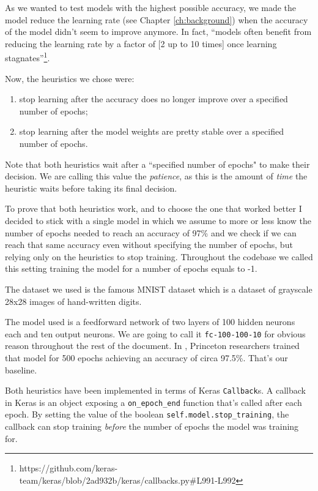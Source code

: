 As we wanted to test models with the highest possible accuracy, we made
the model reduce the learning rate (see Chapter \ref{ch:background})
when the accuracy of the model didn't seem to improve anymore. In fact,
``models often benefit from reducing the learning rate by a factor of
[2 up to 10 times] once learning
stagnates''\footnote{https://github.com/keras-team/keras/blob/2ad932b/keras/callbacks.py\#L991-L992}.

Now, the heuristics we chose were:
\begin{enumerate}
  \item stop learning after the accuracy does no longer improve over a
    specified number of epochs;
  \item stop learning after the model weights are pretty stable over a
    specified number of epochs.
\end{enumerate}

Note that both heuristics wait after a ``specified number of
epochs" to make their decision. We are calling this value the
\emph{patience}, as this is the amount of \emph{time} the heuristic waits
before taking its final decision.

To prove that both heuristics work, and to choose the one that
worked better I decided to stick with a single model in which we assume
to more or less know the number of epochs needed to reach an accuracy
of 97\% and we check if we can reach that same accuracy even without
specifying the number of epochs, but relying only on the heuristics to
stop training. Throughout the codebase we called this setting training
the model for a number of epochs equals to -1.

The dataset we used is the famous MNIST dataset which is a dataset of
grayscale 28x28 images of hand-written digits.

The model used is a feedforward network of two layers of 100 hidden
neurons each and ten output neurons. We are going to call it
\texttt{fc-100-100-10} for obvious reason throughout the rest of the
document. In \cite{bhagoji2018enhancing}, Princeton researchers trained
that model for 500 epochs achieving an accuracy of circa 97.5\%. That's our
baseline.

Both heuristics have been implemented in terms of Keras
\texttt{Callback}s. A callback in Keras is an object exposing a
\texttt{on\_epoch\_end} function that's called after each epoch. By
setting the value of the boolean \texttt{self.model.stop\_training}, the
callback can stop training \emph{before} the number of epochs the model
was training for.

